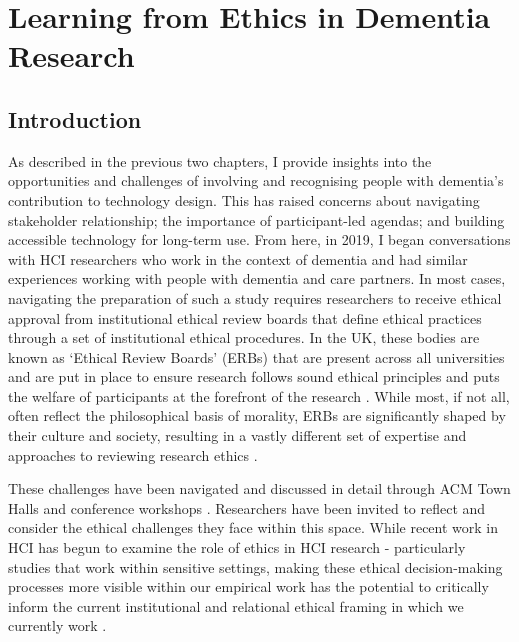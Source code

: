 \chapter{Learning from Ethics in Dementia Research}
\label{EthicsChapter}

\section{Introduction}
\label{Ethics:Intro}
As described in the previous two chapters, I provide insights into the opportunities and challenges of involving and recognising people with dementia's contribution to technology design. This has raised concerns about navigating stakeholder relationship; the importance of participant-led agendas; and building accessible technology for long-term use. From here, in 2019, I began conversations with HCI researchers who work in the context of dementia and had similar experiences working with people with dementia and care partners. In most cases, navigating the preparation of such a study requires researchers to receive ethical approval from institutional ethical review boards that define ethical practices through a set of institutional ethical procedures. In the UK, these bodies are known as ‘Ethical Review Boards’ (ERBs) that are present across all universities and are put in place to ensure research follows sound ethical principles and puts the welfare of participants at the forefront of the research \citep{pachana_can_2014}. While most, if not all, often reflect the philosophical basis of morality, ERBs are significantly shaped by their culture and society, resulting in a vastly different set of expertise and approaches to reviewing research ethics \citep{flicker_ethical_2007}.

These challenges have been navigated and discussed in detail through ACM Town Halls and conference workshops \citep{frauenberger_research_2017,munteanu_sigchi_2019,waycott_ethical_2015}. Researchers have been invited to reflect and consider the ethical challenges they face within this space. While recent work in HCI has begun to examine the role of ethics in HCI research - particularly studies that work within sensitive settings, making these ethical decision-making processes more visible within our empirical work has the potential to critically inform the current institutional and relational ethical framing in which we currently work \citep{oyebode_mental_2005}.

